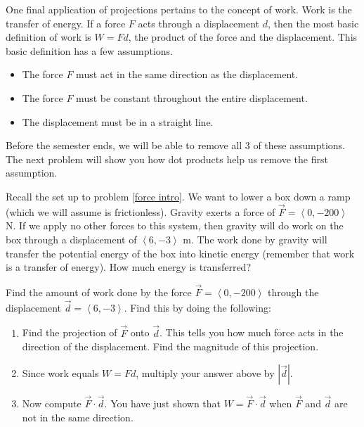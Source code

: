 One final application of projections pertains to the concept of work. Work is the transfer of energy. If a force $F$ acts through a displacement $d$, then the most basic definition of work is $W=Fd$, the product of the force and the displacement.  This basic definition has a few assumptions.
\begin{itemize}
\item The force $F$ must act in the same direction as the displacement.
\item The force $F$ must be constant throughout the entire displacement.
\item The displacement must be in a straight line.
\end{itemize}
Before the semester ends, we will be able to remove all 3 of these assumptions.  The next problem will show you how dot products help us remove the first assumption.

Recall the set up to problem \ref{force intro}.  We want to lower a box down a ramp (which we will assume is frictionless). Gravity exerts a force of $\vec F=\left<0,-200\right>$ N. If we apply no other forces to this system, then gravity will do work on the box through a displacement of $\left<6,-3\right>$ m. The work done by gravity will transfer the potential energy of the box into kinetic energy (remember that work is a transfer of energy).  How much energy is transferred?

\begin{problem}\label{first work problem}
% 
Find the amount of work done by the force $\vec F=\left<0,-200\right>$ through the displacement $\vec d=\left<6,-3\right>$. Find this by doing the following:
\begin{enumerate}
\item Find the projection of $\vec F$ onto $\vec d$. This tells you how much force acts in the direction of the displacement. Find the magnitude of this projection.
\item Since work equals $W=Fd$, multiply your answer above by $|\vec {d}|$.  
\item Now compute $\vec F\cdot \vec d$. You have just shown that $W=\vec F\cdot \vec d$ when $\vec F$ and $\vec d$ are not in the same direction.
\end{enumerate}
\end{problem}





